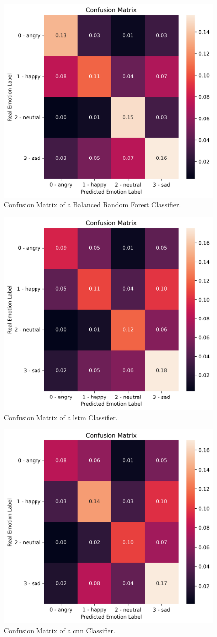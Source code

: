 \begin{figure}[H]
	\centering
	\includegraphics[width=.55\linewidth]{figs/appendix/feature_selection/BalancedForestCM.png}
	\caption{Confusion Matrix of a Balanced Random Forest Classifier.}
\end{figure}

\begin{figure}[H]
	\centering
	\includegraphics[width=.55\linewidth]{figs/appendix/feature_selection/LSTMCM.png}
	\caption{Confusion Matrix of a \ac{lstm} Classifier.}
\end{figure}

\begin{figure}[H]
	\centering
	\includegraphics[width=.55\linewidth]{figs/appendix/feature_selection/CNNCM.png}
	\caption{Confusion Matrix of a \ac{cnn} Classifier.}
\end{figure}

